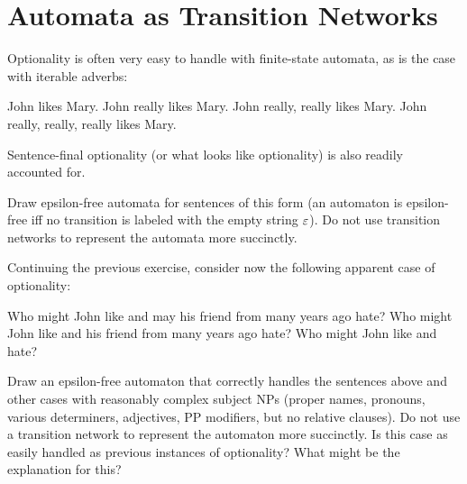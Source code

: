 \chapter{Automata as Transition Networks}
\label{cha:networks}

\begin{exercise}
    Optionality is often very easy to handle with finite-state automata, as is the case with iterable adverbs:
    \begin{exe}
        \ex
        \begin{xlist}
            \ex John likes Mary.
            \ex John really likes Mary.
            \ex John really, really likes Mary.
            \ex John really, really, really likes Mary.
        \end{xlist}
    \end{exe}
    Sentence-final optionality (or what looks like optionality) is also readily accounted for.
    \begin{exe}
        \ex
        \begin{xlist}
        \end{xlist}
        \ex
        \begin{xlist}
        \end{xlist}
    \end{exe}
    Draw epsilon-free automata for sentences of this form (an automaton is epsilon-free iff no transition is labeled with the empty string $\varepsilon$).
    Do not use transition networks to represent the automata more succinctly.
\end{exercise}

\begin{exercise}
    Continuing the previous exercise, consider now the following apparent case of optionality:
    \begin{exe}
        \ex
        \begin{xlist}
            \ex Who might John like and may his friend from many years ago hate?
            \ex Who might John like and his friend from many years ago hate?
            \ex Who might John like and hate?
        \end{xlist}
    \end{exe}
    Draw an epsilon-free automaton that correctly handles the sentences above and other cases with reasonably complex subject NPs (proper names, pronouns, various determiners, adjectives, PP modifiers, but no relative clauses).
    Do not use a transition network to represent the automaton more succinctly.
    Is this case as easily handled as previous instances of optionality?
    What might be the explanation for this?
\end{exercise}

